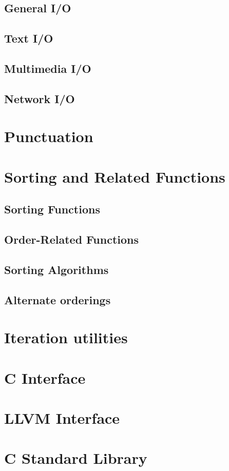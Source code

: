     \section{General I/O}
    \section{Text I/O}
    \section{Multimedia I/O}
    \section{Network I/O}
\chapter{Punctuation}
\chapter{Sorting and Related Functions}
    \section{Sorting Functions}
    \section{Order-Related Functions}
    \section{Sorting Algorithms}
    \section{Alternate orderings}
\chapter{Iteration utilities}
\chapter{C Interface}
\chapter{LLVM Interface}
\chapter{C Standard Library}
